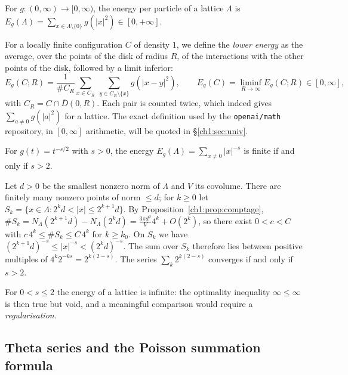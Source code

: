 \begin{definition}\label{ch1:def:enerreseau}
For $g:(0,\infty)\to[0,\infty)$, the energy per particle of a lattice $\Lambda$ is
$E_g(\Lambda)=\sum_{x\in\Lambda\setminus\{0\}} g(|x|^2)\in[0,+\infty]$.
\end{definition}

For a locally finite configuration $C$ of density $1$, we define the \emph{lower energy} as the average, over the points
of the disk of radius $R$, of the interactions with the other points of the disk, followed by a limit inferior:
\[
  E_g(C;R)=\frac{1}{\#C_R}\sum_{x\in C_R}\ \sum_{y\in C_R\setminus\{x\}} g(|x-y|^2),\qquad E_g(C)=\liminf_{R\to\infty}E_g(C;R)\in[0,\infty],
\]
with $C_R=C\cap\overline D(0,R)$. Each pair is counted twice, which indeed gives $\sum_{a\neq0}g(|a|^2)$ for a lattice.
\tierC{} The exact definition used by the \texttt{openai/math} repository, in $[0,\infty]$ arithmetic, will be quoted in §\ref{ch1:sec:univ}.

\begin{proposition}\label{ch1:prop:riesz}
For $g(t)=t^{-s/2}$ with $s>0$, the energy $E_g(\Lambda)=\sum_{x\ne0}|x|^{-s}$ is finite if and only if $s>2$. \tierC{}
\end{proposition}

\begin{humanproof}
Let $d>0$ be the smallest nonzero norm of $\Lambda$ and $V$ its covolume. There are finitely many nonzero points of norm $\le d$;
for $k\ge0$ let $S_k=\{x\in\Lambda : 2^kd<|x|\le 2^{k+1}d\}$. By Proposition~\ref{ch1:prop:comptage},
$\#S_k=N_\Lambda(2^{k+1}d)-N_\Lambda(2^kd)=\frac{3\pi d^2}{V}4^k+O(2^k)$, so there exist $0<c<C$ with $c\,4^k\le\#S_k\le C\,4^k$ for $k\ge k_0$.
On $S_k$ we have $(2^{k+1}d)^{-s}\le |x|^{-s}<(2^kd)^{-s}$. The sum over $S_k$ therefore lies between positive multiples of $4^k2^{-ks}=2^{k(2-s)}$.
The series $\sum_k 2^{k(2-s)}$ converges if and only if $s>2$.
\end{humanproof}

\begin{remark}
For $0<s\le2$ the energy of a lattice is infinite: the optimality inequality $\infty\le\infty$ is then true but void, and a meaningful
comparison would require a \emph{regularisation}. \tierC{}
\end{remark}

\subsection{Theta series and the Poisson summation formula}
\label{ch1:sec:poisson}

